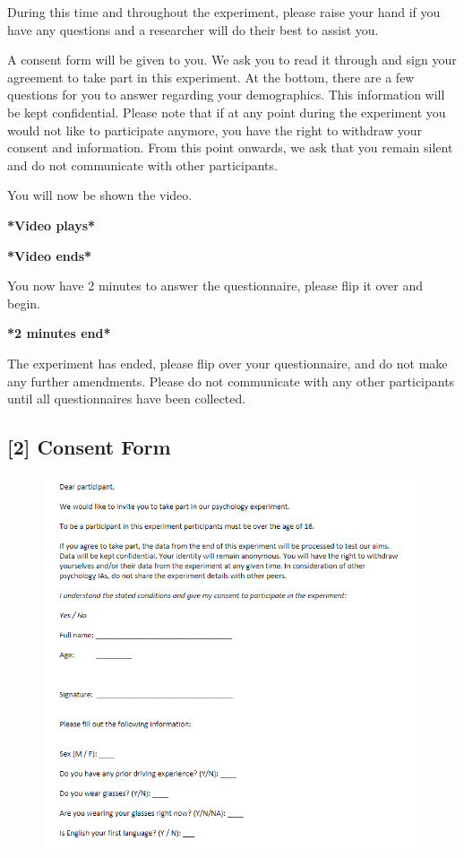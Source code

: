 \documentclass[12pt]{article}
\begin{document}
During this time and throughout the experiment, please raise your hand if you have any questions and a researcher will do their best to assist you.

A consent form will be given to you. We ask you to read it through and sign your agreement to take part in this experiment. At the bottom, there are a few questions for you to answer regarding your demographics. This information will be kept confidential. Please note that if at any point during the experiment you would not like to participate anymore, you have the right to withdraw your consent and information. From this point onwards, we ask that you remain silent and do not communicate with other participants.

You will now be shown the video.

\textbf{*Video plays*}

\textbf{*Video ends*}

You now have 2 minutes to answer the questionnaire, please flip it over and begin.

\textbf{*2 minutes end*} 

The experiment has ended, please flip over your questionnaire, and do not make any further amendments. Please do not communicate with any other participants until all questionnaires have been collected.

\subsection*{[2] Consent Form}

\begin{figure}[H]
	\includegraphics{consent_form}
	\centering
\end{figure}
\pagebreak
\end{document}
